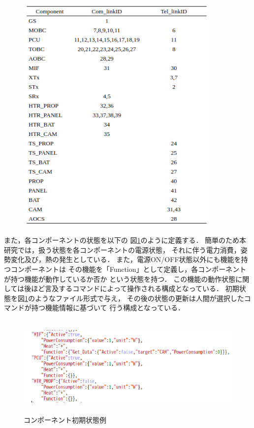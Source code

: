 \documentclass[11pt]{jsreport}
\begin{document}
\begin{figure}[H]
   \centering
      \includegraphics[width=10cm]{figure/compo_link.png}
\end{figure}


\newpage
また，各コンポーネントの状態を以下の
図\ref{fig:Compo_state}のように定義する．
簡単のため本研究では，扱う状態を各コンポーネントの電源状態，
それに伴う電力消費，姿勢変化及び，熱の発生としている．
また，電源ON/OFF状態以外にも機能を持つコンポーネントは
その機能を「Function」として定義し，各コンポーネントが持つ機能が動作しているか否か
という状態を持つ．
この機能の動作状態に関しては後ほど言及するコマンドによって操作される構成となっている．
初期状態を図\ref{fig:Compo_state}のようなファイル形式で与え，
その後の状態の更新は人間が選択したコマンドが持つ機能情報に基づいて
行う構成となっている．
\begin{figure}[H]
   \centering
      \includegraphics[height=5.0cm]{figure/Component_state.png}
      \caption{コンポーネント初期状態例}
      \label{fig:Compo_state}
\end{figure}
\end{document}
